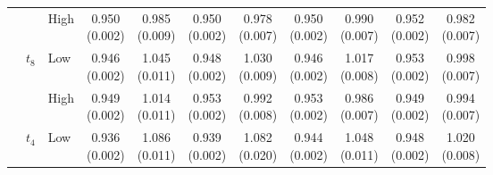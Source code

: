 \begin{table}[!t]
\begin{tabular}{lllcccccccc}
 &  & High & \shortstack{0.950\\[-1pt]\scriptsize(0.002)} & \shortstack{0.985\\[-1pt]\scriptsize(0.009)} & \shortstack{0.950\\[-1pt]\scriptsize(0.002)} & \shortstack{0.978\\[-1pt]\scriptsize(0.007)} & \shortstack{0.950\\[-1pt]\scriptsize(0.002)} & \shortstack{0.990\\[-1pt]\scriptsize(0.007)} & \shortstack{0.952\\[-1pt]\scriptsize(0.002)} & \shortstack{0.982\\[-1pt]\scriptsize(0.007)}\\
\addlinespace[1pt]
 & $t_8$ & Low & \shortstack{0.946\\[-1pt]\scriptsize(0.002)} & \shortstack{1.045\\[-1pt]\scriptsize(0.011)} & \shortstack{0.948\\[-1pt]\scriptsize(0.002)} & \shortstack{1.030\\[-1pt]\scriptsize(0.009)} & \shortstack{0.946\\[-1pt]\scriptsize(0.002)} & \shortstack{1.017\\[-1pt]\scriptsize(0.008)} & \shortstack{0.953\\[-1pt]\scriptsize(0.002)} & \shortstack{0.998\\[-1pt]\scriptsize(0.007)}\\
 &  & High & \shortstack{0.949\\[-1pt]\scriptsize(0.002)} & \shortstack{1.014\\[-1pt]\scriptsize(0.011)} & \shortstack{0.953\\[-1pt]\scriptsize(0.002)} & \shortstack{0.992\\[-1pt]\scriptsize(0.008)} & \shortstack{0.953\\[-1pt]\scriptsize(0.002)} & \shortstack{0.986\\[-1pt]\scriptsize(0.007)} & \shortstack{0.949\\[-1pt]\scriptsize(0.002)} & \shortstack{0.994\\[-1pt]\scriptsize(0.007)}\\
\addlinespace[1pt]
 & $t_4$ & Low & \shortstack{0.936\\[-1pt]\scriptsize(0.002)} & \shortstack{1.086\\[-1pt]\scriptsize(0.011)} & \shortstack{0.939\\[-1pt]\scriptsize(0.002)} & \shortstack{1.082\\[-1pt]\scriptsize(0.020)} & \shortstack{0.944\\[-1pt]\scriptsize(0.002)} & \shortstack{1.048\\[-1pt]\scriptsize(0.011)} & \shortstack{0.948\\[-1pt]\scriptsize(0.002)} & \shortstack{1.020\\[-1pt]\scriptsize(0.008)}\\

\end{tabular}
\end{table}
